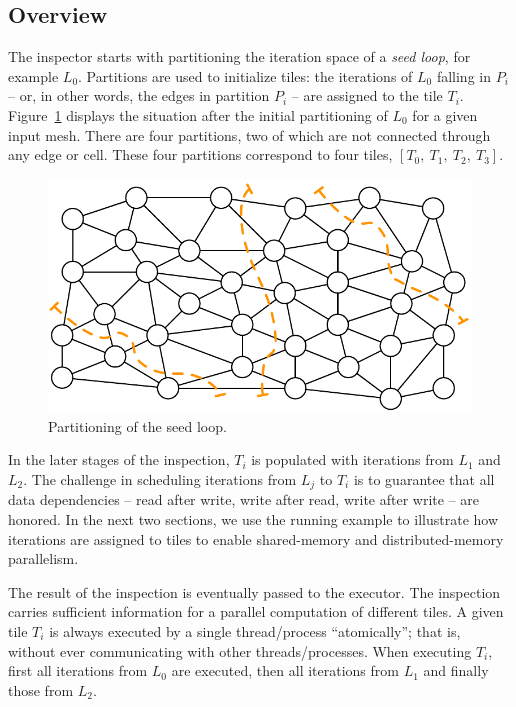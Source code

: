 \subsection*{Overview}
The inspector starts with partitioning the iteration space of a \textit{seed loop}, for example $L_0$. Partitions are used to initialize tiles: the iterations of $L_0$ falling in $P_i$ -- or, in other words, the edges in partition $P_i$ -- are assigned to the tile $T_i$. Figure~\ref{fig:st-initial-part-sm} displays the situation after the initial partitioning of $L_0$ for a given input mesh. There are four partitions, two of which are not connected through any edge or cell. These four partitions correspond to four tiles, $[T_0,\ T_1,\ T_2,\ T_3]$.

\begin{figure}
\centering
\includegraphics[scale=0.7]{sparsetiling/figures/partiotioned.pdf}
\caption{Partitioning of the seed loop.}
\label{fig:st-initial-part-sm}
\end{figure}

In the later stages of the inspection, $T_i$ is populated with iterations from $L_1$ and $L_2$. The challenge in scheduling iterations from $L_j$ to $T_i$ is to guarantee that all data dependencies -- read after write, write after read, write after write -- are honored. In the next two sections, we use the running example to illustrate how iterations are assigned to tiles to enable shared-memory and distributed-memory parallelism.

The result of the inspection is eventually passed to the executor. The inspection carries sufficient information for a parallel computation of different tiles. A given tile $T_i$ is always executed by a single thread/process ``atomically''; that is, without ever communicating with other threads/processes. When executing $T_i$, first all iterations from $L_0$ are executed, then all iterations from $L_1$ and finally those from $L_2$.

